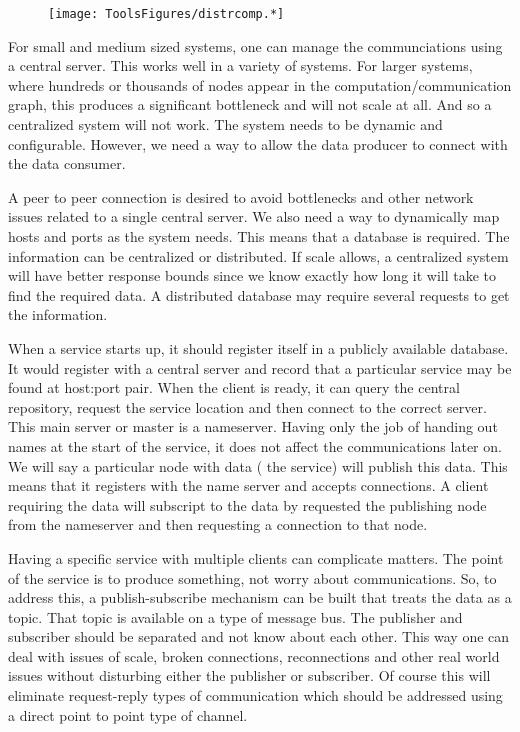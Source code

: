 \begin{figure}
\centering
\texttt{[image: ToolsFigures/distrcomp.*]}
\caption{}
\end{figure}

For small and medium sized systems, one can manage the communciations
using a central server. This works well in a variety of systems. For
larger systems, where hundreds or thousands of nodes appear in the
computation/communication graph, this produces a significant bottleneck
and will not scale at all. And so a centralized system will not work.
The system needs to be dynamic and configurable. However, we need a way
to allow the data producer to connect with the data consumer.

A peer to peer connection is desired to avoid bottlenecks and other
network issues related to a single central server. We also need a way to
dynamically map hosts and ports as the system needs. This means that a
database is required. The information can be centralized or distributed.
If scale allows, a centralized system will have better response bounds
since we know exactly how long it will take to find the required data. A
distributed database may require several requests to get the
information.

When a service starts up, it should register itself in a publicly
available database. It would register with a central server and record
that a particular service may be found at host:port pair. When the
client is ready, it can query the central repository, request the
service location and then connect to the correct server. This main
server or master is a nameserver. Having only the job of handing out
names at the start of the service, it does not affect the communications
later on. We will say a particular node with data ( the service) will
publish this data. This means that it registers with the name server and
accepts connections. A client requiring the data will subscript to the
data by requested the publishing node from the nameserver and then
requesting a connection to that node.

Having a specific service with multiple clients can complicate matters.
The point of the service is to produce something, not worry about
communications. So, to address this, a publish-subscribe mechanism can
be built that treats the data as a topic. That topic is available on a
type of message bus. The publisher and subscriber should be separated
and not know about each other. This way one can deal with issues of
scale, broken connections, reconnections and other real world issues
without disturbing either the publisher or subscriber. Of course this
will eliminate request-reply types of communication which should be
addressed using a direct point to point type of channel.

